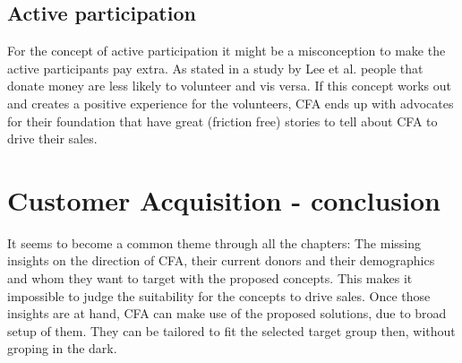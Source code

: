 \subsection{Active participation}

For the concept of active participation it might be a misconception to make the active participants pay extra. As stated in a study by Lee et al. people that donate money are less likely to volunteer and vis versa\cite{Lee2007}. If this concept works out and creates a positive experience for the volunteers, CFA ends up with advocates for their foundation that have great (friction free) stories to tell about CFA to drive their sales.


\section{Customer Acquisition - conclusion}

It seems to become a common theme through all the chapters: The missing insights on the direction of CFA, their current donors and their demographics and whom they want to target with the proposed concepts. This makes it impossible to judge the suitability for the concepts to drive sales. Once those insights are at hand, CFA can make use of the proposed solutions, due to broad setup of them. They can be tailored to fit the selected target group then, without groping in the dark. 
